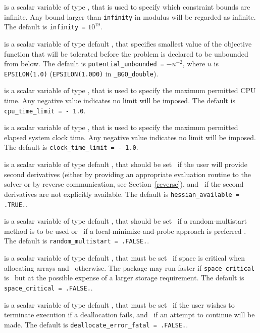 \documentclass{galahad}
\newcommand{\packagename}{BGO}
\newcommand{\fullpackagename}{\libraryname\_\packagename}
\begin{document}
\begin{description}
 is a scalar variable of type \realdp, that is used to
specify which constraint bounds are infinite.
Any bound larger than {\tt infinity} in modulus will be regarded as infinite.
The default is {\tt infinity =} $10^{19}$.

  is a scalar variable of type default
\realdp, that specifies smallest
value of the objective function that will be tolerated before the problem
is declared to be unbounded from below.
The default is {\tt potential\_u\-nbounded =} $-u^{-2}$,
where $u$ is {\tt EPSILON(1.0)} ({\tt EPSILON(1.0D0)} in
{\tt \fullpackagename\_double}).

 is a scalar variable of type \realdp,
that is used to specify the maximum permitted CPU time. Any negative
value indicates no limit will be imposed. The default is
{\tt cpu\_time\_limit = - 1.0}.

 is a scalar variable of type \realdp,
that is used to specify the maximum permitted elapsed system clock time.
Any negative value indicates no limit will be imposed. The default is
{\tt clock\_time\_limit = - 1.0}.

is a scalar variable of type default \logical,
that should be set \true\ if the user will provide second derivatives
(either by providing an appropriate evaluation routine to the solver
or by reverse communication, see Section~\ref{reverse}), and
\false\ if the second derivatives are not explicitly available.
The default is {\tt hessian\_available = .TRUE.}.

is a scalar variable of type default \logical,
that should be set \true\ if a random-multistart method is to be used or
\false\ if a local-minimize-and-probe approach is preferred .
The default is {\tt random\_\-multistart = .FALSE.}.

 is a scalar variable of type default \logical,
that must be set \true\ if space is critical when allocating arrays
and  \false\ otherwise. The package may run faster if
{\tt space\_critical} is \false\ but at the possible expense of a larger
storage requirement. The default is {\tt space\_critical = .FALSE.}.

 is a scalar variable of type default \logical,
that must be set \true\ if the user wishes to terminate execution if
a deallocation  fails, and \false\ if an attempt to continue
will be made. The default is {\tt deallocate\_error\_fatal = .FALSE.}.


\end{description}
\end{document}
